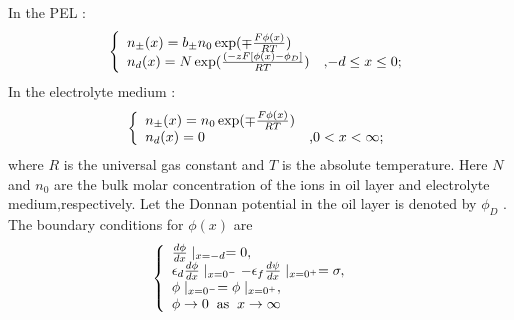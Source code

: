 \documentclass[11 pt]{article}
\begin{document}
   In the PEL : \begin{equation}
   \left\{
                              \begin{array}{ll}
                            n_{\pm}(x)=b_{\pm}n_{0}\exp(\mp\frac{F\phi(x)}{RT}) \\
                       n_{d}(x)=N\exp(\frac{(-zF[\phi(x)-\phi_{D}]}{RT})     & \hbox{,$-d \le x \leq0$;} \\
\end{array}
\right.
\label{2}
\end{equation}
In the electrolyte medium :\begin{equation}
   \left\{
                              \begin{array}{ll}
                            n_{\pm}(x)=n_{0}\exp(\mp\frac{F\phi(x)}{RT})& \\
                       n_{d}(x)=0     & \hbox{,$0 < x <\infty$;} \\
\end{array}
\right.
\label{3}
\end{equation}
where $R$ is the universal gas constant and $T$ is the absolute temperature. Here $N$ and $n_{0}$ are the bulk molar concentration of the ions in oil layer and electrolyte medium,respectively. Let the Donnan potential in the oil layer is denoted by $\phi_{D}$ .
The boundary conditions for $\phi(x)$ are
 \begin{equation}
 \left\{
                                                                  \begin{array}{ll}
                                                              \frac{d \phi}{d x} \mid_{x=-d}=0, &  \\
                                                              \epsilon_{d} \frac{d \phi}{d x} \mid_{x=0^{-}}-\epsilon_{f} \frac{d \psi}{d x} \mid_{x=0^{+}}=\sigma,   &  \\
                                                                  \phi \mid_{x=0^{-}}=\phi \mid_{x=0^{+}}, &\\
                                                                  \phi\rightarrow 0 \hspace{.2cm} \text{as} \hspace{.2cm} x \rightarrow \infty
                                                                  \end{array}
                                                                 \right.
                                                               \label{4}
\end{equation}
\end{document}
